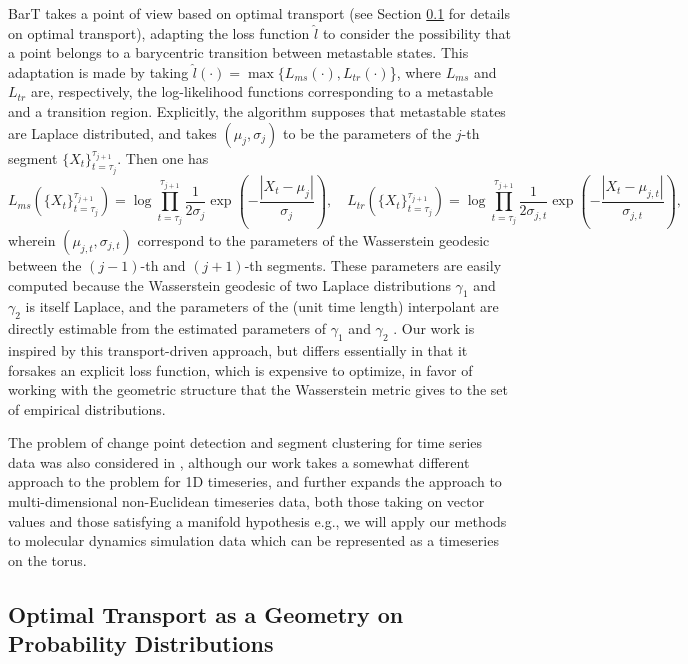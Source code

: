 \documentclass{article}
\begin{document}
BarT takes a point of view based on optimal transport (see Section \ref{otsec} for details on optimal transport), adapting the loss function \(\hat{l}\) to consider the possibility that a point belongs to a barycentric transition between metastable states. This adaptation is made by taking \(\hat{l}(\cdot) = \max\{L_{ms}(\cdot), L_{tr}(\cdot)\)\}, where \(L_{ms}\) and \(L_{tr}\) are, respectively, the log-likelihood functions corresponding to a metastable and a transition region. Explicitly, the algorithm supposes that metastable states are Laplace distributed, and takes \((\mu_j, \sigma_j)\) to be the parameters of the \(j\)-th segment \(\{X_t\}_{t={\tau_j}}^{\tau_{j+1}}\). Then one has
\begin{equation*}
    L_{ms}(\{X_t\}_{t={\tau_j}}^{\tau_{j+1}}) = \log\prod\limits_{t={\tau_j}}^{\tau_{j+1}} \frac{1}{2\sigma_j}\exp\left(-\frac{|X_t - \mu_j|}{\sigma_j}\right), \quad L_{tr}(\{X_t\}_{t={\tau_j}}^{\tau_{j+1}}) = \log\prod\limits_{t={\tau_j}}^{\tau_{j+1}} \frac{1}{2\sigma_{j,t}}\exp\left(-\frac{|X_t - \mu_{j,t}|}{\sigma_{j,t}}\right),
\end{equation*}
wherein \((\mu_{j,t}, \sigma_{j,t})\) correspond to the parameters of the Wasserstein geodesic between the \((j-1)\)-th and \((j+1)\)-th segments. These parameters are easily computed because the Wasserstein geodesic of two Laplace distributions \(\gamma_1\) and \(\gamma_2\) is itself Laplace, and the parameters of the (unit time length) interpolant are directly estimable from the estimated parameters of \(\gamma_1\) and \(\gamma_2\) \cite{damjanovicModelingChangesMolecular2023}. 
Our work is inspired by this transport-driven approach, but differs essentially in that it forsakes an explicit loss function, which is expensive to optimize, in favor of working with the geometric structure that the Wasserstein metric gives to the set of empirical distributions. 

The problem of change point detection and segment clustering for time series data was also considered in \cite{chengOptimalTransportBased2020}, although our work takes a somewhat different approach to the problem for 1D timeseries, and further expands the approach to multi-dimensional non-Euclidean timeseries data, both those taking on vector values and those satisfying a manifold hypothesis e.g., we will apply our methods to molecular dynamics simulation data which can be represented as a timeseries on the torus.

\subsection{Optimal Transport as a Geometry on Probability Distributions}\label{otsec}
\end{document}

